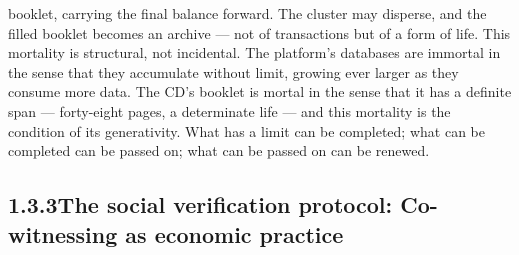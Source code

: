 booklet, carrying the final balance forward. The cluster may disperse, and the filled booklet becomes an archive — not of transactions but of a form of life. This mortality is structural, not incidental. The platform’s databases are immortal in the sense that they accumulate without limit, growing ever larger as they consume more data. The CD’s booklet is mortal in the sense that it has a definite span — forty-eight pages, a determinate life — and this mortality is the condition of its generativity. What has a limit can be completed; what can be completed can be passed on; what can be passed on can be renewed.

\subsection{1.3.3\quad The social verification protocol: Co-witnessing as economic practice}

